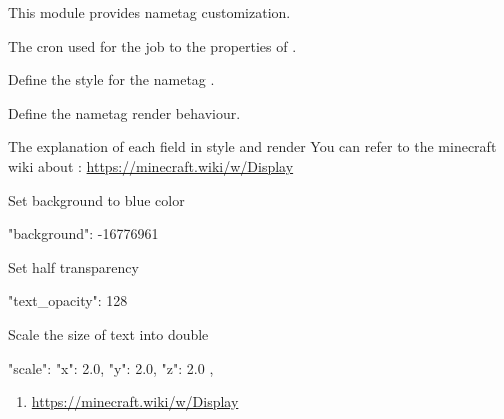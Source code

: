 This module provides nametag customization.

\begin{Configuration}
    \item[update\_cron]{
        The cron used for the job to  the properties of .
    }

    \item[style]{
        Define the style for the nametag .
    }

    \item[render]{
        Define the nametag render behaviour.
        \begin{note}{The explanation of each field in style and render}
            You can refer to the minecraft wiki about : \url{https://minecraft.wiki/w/Display}
        \end{note}
    }
\end{Configuration}

\begin{example}{Set background to blue color}
    \begin{json}
        "background": -16776961
    \end{json}
\end{example}

\begin{example}{Set half transparency}
    \begin{json}
        "text_opacity": 128
    \end{json}
\end{example}

\begin{example}{Scale the size of text into double}
    \begin{json}
        "scale": {
            "x": 2.0,
            "y": 2.0,
            "z": 2.0
        },
    \end{json}

\end{example}

\begin{enumerate}
    \item \url{https://minecraft.wiki/w/Display}
\end{enumerate}